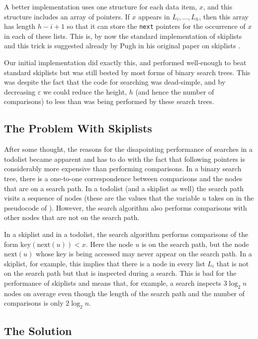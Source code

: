 \documentclass[lotsofwhite]{patmorin}
\newcommand{\eps}{\varepsilon}
\begin{document}
A better implementation uses one structure for each data item, $x$,
and this structure includes an array of pointers.  If $x$ appears in
$L_{i},\ldots,L_h$, then this array has length $h-i+1$ so that it can
store the \texttt{next} pointers for the occurrence of $x$ in each of
these lists.  This is, by now the standard implementation of skiplists
and this trick is suggested already by Pugh in his original paper on
skiplists \cite{pXX}.

Our initial implementation did exactly this, and performed well-enough
to beat standard skiplists but was still bested by most forms of binary
search trees.  This was despite the fact that the code for searching was
dead-simple, and by decreasing $\eps$ we could reduce the height, $h$ (and
hence the number of comparisons) to less than was being performed by these
search trees.

\subsection{The Problem With Skiplists}

After some thought, the reasons for the disapointing performance
of searches in a todolist became apparent and has to do with the
fact that following pointers is considerably more expensive than
performing comparisons.  In a binary search tree, there is a one-to-one
correspondence between comparisons and the nodes that are on a search
path.  In a todolist (and a skiplist as well) the search path visits a
sequence of nodes (these are the values that the variable $u$ takes on
in the pseudocode of ).  However, the search
algorithm also performs comparisons with other nodes that are not on
the search path.

In a skiplist and in a todolist, the search algorithm performs comparisons
of the form $\mathrm{key}(\mathrm{next}(u)) < x$.  Here the node $u$
is on the search path, but the node $\mathrm{next}(u)$ whose key is
being accessed may never appear on the search path.  In a skiplist,
for example, this implies that there is a node in every list $L_i$
that is not on the search path but that is inspected during a search.
This is bad for the performance of skiplists and means that, for example,
a search inspects $3\log_2 n$ nodes on average even though the length
of the search path and the number of comparisons is only $2\log_2 n$.

\subsection{The Solution}
\end{document}

